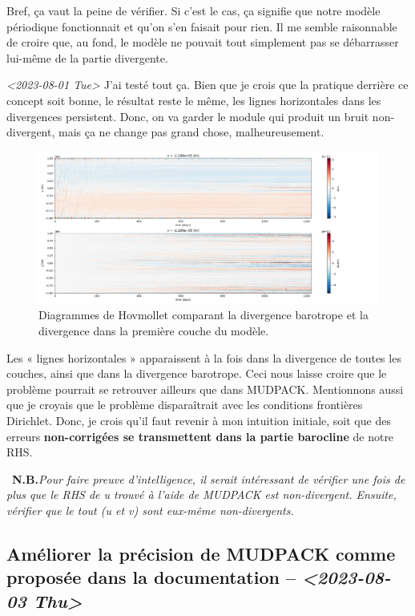 \documentclass[10pt]{article}
\numberwithin{equation}{section}
\newcommand{\nb}{\ding{165}\ \textbf{N.B.}\hspace{4pt}}
\begin{document}
Bref, ça vaut la peine de vérifier.
Si c'est le cas, ça signifie que notre modèle périodique fonctionnait et qu'on s'en faisait pour rien.
Il me semble raisonnable de croire que, au fond, le modèle ne pouvait tout simplement pas se débarrasser lui-même de la partie divergente.\bigskip

\textit{<2023-08-01 Tue> } J'ai testé tout ça.
Bien que je crois que la pratique derrière ce concept soit bonne, le résultat reste le même, les lignes horizontales dans les divergences persistent.
Donc, on va garder le module qui produit un bruit non-divergent, mais ça ne change pas grand chose, malheureusement.

\begin{figure}[htbp]
\centering
\includegraphics[width=.9\linewidth]{figures/debuggage/2023_08_03_comp_divergences.png}
\caption{Diagrammes de Hovmollet comparant la divergence barotrope et la divergence dans la première couche du modèle.}
\end{figure}

Les « lignes horizontales » apparaissent à la fois dans la divergence de toutes les couches, ainsi que dans la divergence barotrope.
Ceci nous laisse croire que le problème pourrait se retrouver ailleurs que dans MUDPACK.
Mentionnons aussi que je croyais que le problème disparaîtrait avec les conditions frontières Dirichlet.
Donc, je crois qu'il faut revenir à mon intuition initiale, soit que des erreurs \textbf{non-corrigées se transmettent dans la partie barocline} de notre RHS.\bigskip

\nb \emph{Pour faire preuve d'intelligence, il serait intéressant de vérifier une fois de plus que le RHS de u trouvé à l'aide de MUDPACK est non-divergent.
Ensuite, vérifier que le tout (u et v) sont eux-même non-divergents.}


\subsection{Améliorer la précision de MUDPACK comme proposée dans la documentation -- \textit{<2023-08-03 Thu>}}
\label{sec:org792a9d8}
\end{document}
